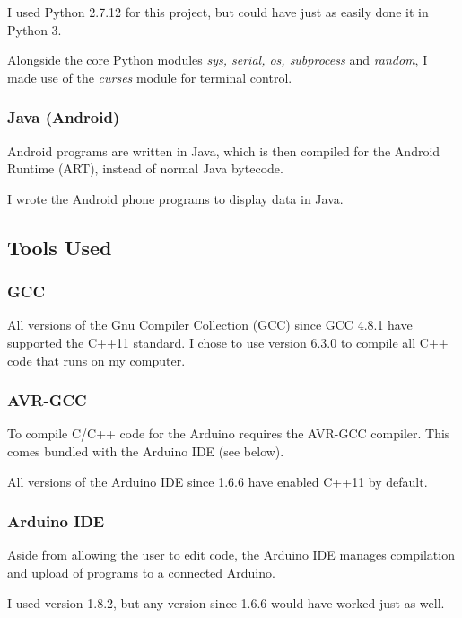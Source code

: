 \documentclass[a4paper]{article}
\begin{document}
I used Python 2.7.12 for this project, but could have just as easily done it in Python 3.

Alongside the core Python modules \textit{sys, serial, os, subprocess} and \textit{random}, I made use of the \textit{curses}\cite{ppref13} module for terminal control.

\subsubsection{Java (Android)}

Android\cite{ppref14} programs are written in Java, which is then compiled for the Android Runtime (ART)\cite{ppref15}, instead of normal Java bytecode.

I wrote the Android phone programs to display data in Java.

\subsection{Tools Used}%

\subsubsection{GCC}

All versions of the Gnu Compiler Collection (GCC) since GCC 4.8.1 have supported the C++11 standard\cite{ppref16}. I chose to use version 6.3.0\cite{ppref17} to compile all C++ code that runs on my computer.

\subsubsection{AVR-GCC}

To compile C/C++ code for the Arduino requires the AVR-GCC compiler. This comes bundled with the Arduino IDE\cite{ppref8} (see below).

All versions of the Arduino IDE since 1.6.6 have enabled C++11 by default.

\subsubsection{Arduino IDE}

Aside from allowing the user to edit code, the Arduino IDE\cite{ppref18} manages compilation and upload of programs to a connected Arduino.

I used version 1.8.2, but any version since 1.6.6 would have worked just as well.
\end{document}

